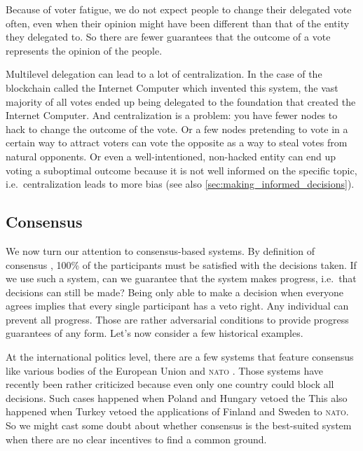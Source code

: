 Because of voter fatigue, we do not expect people to change their delegated vote often, even when their opinion might have been different than that of the entity they delegated to.
So there are fewer guarantees that the outcome of a vote represents the opinion of the people.

Multilevel delegation can lead to a lot of centralization.
In the case of the blockchain called the Internet Computer which invented this system, the vast majority of all votes ended up being delegated to the foundation that created the Internet Computer.
And centralization is a problem: you have fewer nodes to hack to change the outcome of the vote.
Or a few nodes pretending to vote in a certain way to attract voters can vote the opposite as a way to steal votes from natural opponents.
Or even a well-intentioned, non-hacked entity can end up voting a suboptimal outcome because it is not well informed on the specific topic, i.e.\ centralization leads to more bias (see also \cref{sec:making_informed_decisions}).

\subsection{Consensus}
\label{sec:consensus}

We now turn our attention to consensus-based systems.
By definition of consensus%
, 100\% of the participants must be satisfied with the decisions taken.
If we use such a system, can we guarantee that the system makes progress, i.e.\ that decisions can still be made?
Being only able to make a decision when everyone agrees implies that every single participant has a veto right.
Any individual can prevent all progress.
Those are rather adversarial conditions to provide progress guarantees of any form.
Let's now consider a few historical examples.

At the international politics level, there are a few systems that feature consensus like various bodies of the European Union \cite{boffey_eu_2020} and \textsc{nato} \cite{nato_consensus_2022}.
Those systems have recently been rather criticized because even only one country could block all decisions.
Such cases happened when Poland and Hungary vetoed the 
This also happened when Turkey vetoed the applications of Finland and Sweden to \textsc{nato}.
So we might cast some doubt about whether consensus is the best-suited system when there are no clear incentives to find a common ground.

